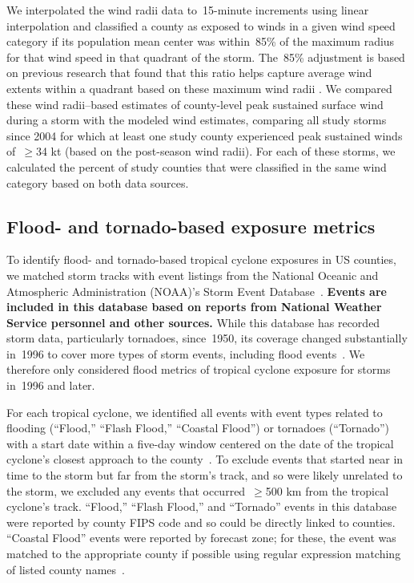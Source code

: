We interpolated the wind radii data to~15-minute increments using linear
interpolation \parencite{hurricaneexposuredata} and classified a county as
exposed to winds in a given wind speed category if its population mean center
was within~85\% of the maximum radius for that wind speed in that quadrant of
the storm. The~85\% adjustment is based on previous research that found that
this ratio helps capture average wind extents within a quadrant based on these
maximum wind radii \parencite{knaff2016using}.  We compared these wind
radii--based estimates of county-level peak sustained surface wind during a
storm with the modeled wind estimates, comparing all study storms since 2004
for which at least one study county experienced peak sustained winds of~$\ge$34
kt (based on the post-season wind radii). For each of these storms, we
calculated the percent of study counties that were classified in the same wind
category based on both data sources.

\subsection*{Flood- and tornado-based exposure metrics}

To identify flood- and tornado-based tropical cyclone exposures in \ac{US}
counties, we matched storm tracks with event listings from the National Oceanic
and Atmospheric Administration (NOAA)'s Storm Event
Database~\parencite{stormevents}. \textbf{Events are included in this database
based on reports from National Weather Service personnel and other sources.}
While this database has recorded storm data, particularly tornadoes,
since~1950, its coverage changed substantially in~1996 to cover more types of
storm events, including flood events~\parencite{stormevents}. We therefore only
considered flood metrics of tropical cyclone exposure for storms in~1996 and
later.

For each tropical cyclone, we identified all events with event types related to
flooding (``Flood,'' ``Flash Flood,'' ``Coastal Flood'') or tornadoes
(``Tornado'') with a start date within a five-day window centered on the date
of the tropical cyclone's closest approach to the
county~\parencite{hurricaneexposuredata}. To exclude events that started near
in time to the storm but far from the storm's track, and so were likely
unrelated to the storm, we excluded any events that occurred~$\ge$500
\si{\kilo\metre} from the tropical cyclone's track. ``Flood,'' ``Flash Flood,''
and ``Tornado'' events in this database were reported by county \ac{FIPS} code
and so could be directly linked to counties.  ``Coastal Flood'' events were
reported by forecast zone; for these, the event was matched to the appropriate
county if possible using regular expression matching of listed county
names~\parencite{noaastormevents}. 


